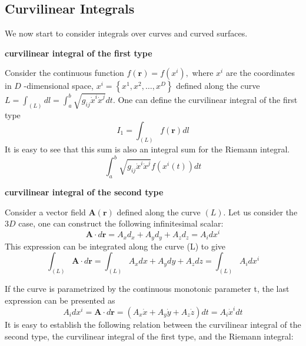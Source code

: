 \subsection{Curvilinear Integrals}
We now start to consider integrals over curves and curved surfaces.

\begin{defi}
        \textbf{curvilinear integral of the first type}
        
        Consider the continuous function $f(\mathbf{r})=f\left(x^{i}\right),$ where $x^{i}$ are the coordinates in $D$ -dimensional space, $x^{i}=\left\{x^{1}, x^{2}, \ldots, x^{D}\right\}$ defined along the curve $L=\int_{(L)} d l=\int_{a}^{b} \sqrt{g_{i j} \dot{x}^{i} \dot{x}^{j}} d t$. One can define the curvilinear integral of the first type
        \begin{equation}
I_{1}=\int_{(L)} f(\mathbf{r}) d l
\end{equation}
It is easy to see that this sum is also an integral sum for the Riemann integral.
\begin{equation}
\int_{a}^{b} \sqrt{g_{i j} \dot{x}^{i} \dot{x}^{j}} f\left(x^{i}(t)\right) d t
\end{equation}
\end{defi}
\begin{defi}
        \textbf{curvilinear integral of the second type}
        
 Consider a vector field $\mathbf{A}(\mathbf{r})$ defined along the curve $(L) .$ Let us consider the $3 D$ case, one can construct the following infinitesimal scalar:
\begin{equation}
\mathbf{A} \cdot d \mathbf{r}=A_{x} d_{x}+A_{y} d_{y}+A_{z} d_{z}=A_{i} d x^{i}
\end{equation}
This expression can be integrated along the curve (L) to give
\begin{equation}
\int_{(L)} \mathbf{A} \cdot d \mathbf{r}=\int_{(L)} A_{x} d x+A_{y} d y+A_{z} d z=\int_{(L)} A_{i} d x^{i}
\end{equation}
\end{defi}
If the curve is parametrized by the continuous monotonic parameter t, the last expression
can be presented as
\begin{equation}
A_{i} d x^{i}=\mathbf{A} \cdot d \mathbf{r}=\left(A_{x} \dot{x}+A_{y} \dot{y}+A_{z} \dot{z}\right) d t=A_{i} \dot{x}^{i} d t
\end{equation}
It is easy to establish the following relation between the curvilinear integral of the second type, the curvilinear integral of the first type, and the Riemann integral:
